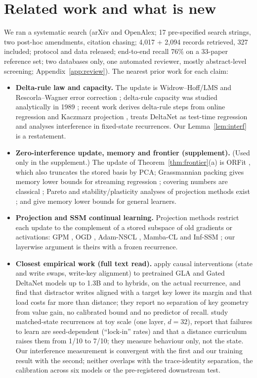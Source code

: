 \documentclass{article}
\begin{document}
\section{Related work and what is new}\label{sec:related}
We ran a systematic search (arXiv and OpenAlex; 17 pre-specified search strings, two post-hoc amendments, citation chasing; 4{,}017 + 2{,}094 records retrieved, 327 included; protocol and data released; end-to-end recall 76\% on a 33-paper reference set; two databases only, one automated reviewer, mostly abstract-level screening; Appendix~\ref{app:review}). The nearest prior work for each claim:
\begin{itemize}
  \item \textbf{Delta-rule law and capacity.} The update is Widrow--Hoff/LMS and Rescorla--Wagner error correction \citep{widrow1960adaptive,rescorla1972theory}; delta-rule capacity was studied analytically in 1989 \citep{prados1989capacity}; recent work derives delta-rule steps from online regression and Kaczmarz projection \citep{wang2025testtime,liu2025longhorn}, treats DeltaNet as test-time regression \citep{yang2024deltanet,yang2025gdn,sun2024ttt,behrouz2025titans} and analyses interference in fixed-state recurrences. Our Lemma~\ref{lem:interf} is a restatement.
  \item \textbf{Zero-interference update, memory and frontier (supplement).} (Used only in the supplement.) The update of Theorem~\ref{thm:frontier}(a) is ORFit \citep{min2022orfit}, which also truncates the stored basis by PCA; Grassmannian packing gives memory lower bounds for streaming regression \citep{dagan2019space}; covering numbers are classical \citep{szarek1998metric,pajor1998metric}; Pareto and stability/plasticity analyses of projection methods exist \citep{zhao2023rethinking}; \citet{chen2022memory} and \citet{knoblauch2020optimal} give memory lower bounds for general learners.
  \item \textbf{Projection and SSM continual learning.} Projection methods restrict each update to the complement of a stored subspace of old gradients or activations: GPM \citep{saha2021gradient}, OGD \citep{farajtabar2020orthogonal}, Adam-NSCL \citep{wang2021training}, Mamba-CL \citep{cheng2024mamba} and Inf-SSM \citep{lee2025exemplar}; our layerwise argument is theirs with a frozen recurrence.
  \item \textbf{Closest empirical work (full text read).} \citet{lee2026how} apply causal interventions (state and write swaps, write-key alignment) to pretrained GLA and Gated DeltaNet models up to 1.3B and to hybrids, on the actual recurrence, and find that distractor writes aligned with a target key lower its margin and that load costs far more than distance; they report no separation of key geometry from value gain, no calibrated bound and no predictor of recall. \citet{boesch2026anatomy} study matched-state recurrences at toy scale (one layer, $d=32$), report that failures to learn are seed-dependent (``lock-in'' rates) and that a distance curriculum raises them from 1/10 to 7/10; they measure behaviour only, not the state. Our interference measurement is convergent with the first and our training result with the second; neither overlaps with the trace-identity separation, the calibration across six models or the pre-registered downstream test.

\end{itemize}
\end{document}
